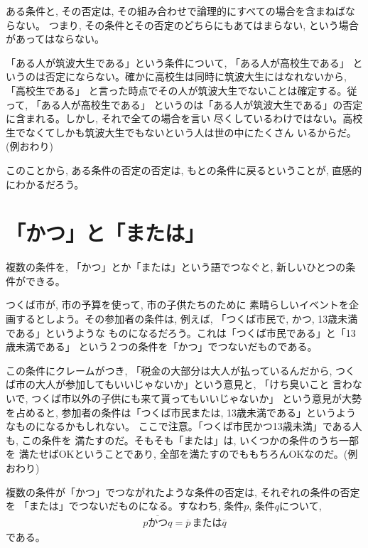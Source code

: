 ある条件と, その否定は, その組み合わせで論理的にすべての場合を含まねばならない。
つまり, その条件とその否定のどちらにもあてはまらない, という場合があってはならない。
\begin{exmpl} 「ある人が筑波大生である」という条件について, 「ある人が高校生である」
というのは否定にならない。確かに高校生は同時に筑波大生にはなれないから, 「高校生である」
と言った時点でその人が筑波大生でないことは確定する。従って, 「ある人が高校生である」
というのは「ある人が筑波大生である」の否定に含まれる。しかし, それで全ての場合を言い
尽くしているわけではない。高校生でなくてしかも筑波大生でもないという人は世の中にたくさん
いるからだ。
(例おわり)\end{exmpl}
\mv

このことから, ある条件の否定の否定は, もとの条件に戻るということが, 
直感的にわかるだろう。\\

\section{「かつ」と「または」}

複数の条件を, 「かつ」とか「または」という語でつなぐと, 新しいひとつの条件ができる。

\begin{exmpl} つくば市が, 市の予算を使って, 市の子供たちのために
素晴らしいイベントを企画するとしよう。その参加者の条件は, 
例えば, 「つくば市民で, かつ, 13歳未満である」というような
ものになるだろう。これは「つくば市民である」と「13歳未満である」
という２つの条件を「かつ」でつないだものである。

この条件にクレームがつき, 「税金の大部分は大人が払っているんだから, 
つくば市の大人が参加してもいいじゃないか」という意見と, 「けち臭いこと
言わないで, つくば市以外の子供にも来て貰ってもいいじゃないか」
という意見が大勢を占めると, 参加者の条件は「つくば市民または, 
13歳未満である」というようなものになるかもしれない。
ここで注意。「つくば市民かつ13歳未満」である人も, この条件を
満たすのだ。そもそも「または」は, いくつかの条件のうち一部を
満たせばOKということであり, 全部を満たすのでももちろんOKなのだ。(例おわり)
\end{exmpl}

複数の条件が「かつ」でつながれたような条件の否定は, それぞれの条件の否定を
「または」でつないだものになる。すなわち, 条件$p$, 条件$q$について, 
\begin{eqnarray}
\overline{p\text{かつ}q}=\overline{p}\,\text{または}\overline{q}
\end{eqnarray}
である。

